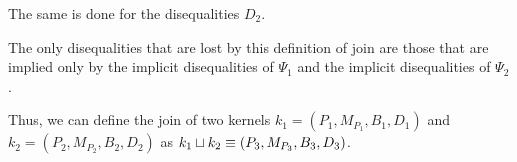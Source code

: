 The same is done for the disequalities $D_2$.

The only disequalities that are lost by this definition of join are those that are implied only by the implicit disequalities of $\Psi_1$ and the implicit disequalities of $\Psi_2$.

Thus, we can define the join of two kernels $k_1 = (P_1, M_{P_1},B_1, D_1)$ and $k_2 = (P_2, M_{P_2},B_2, D_2)$ as $k_1 \sqcup k_2 \equiv (P_3, M_{P_3},B_3, D_3)$.
